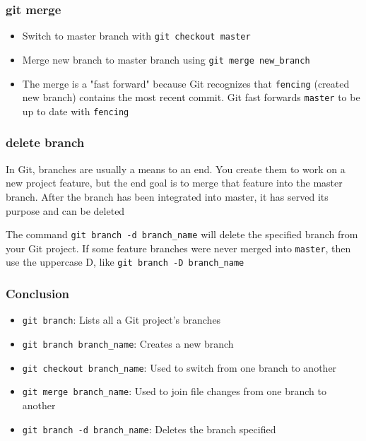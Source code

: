 \documentclass[a4paper, 12pt]{article}
\begin{document}
\subsubsection{git merge}
\begin{itemize}
\item Switch to master branch with \verb|git checkout master|

\item Merge new branch to master branch using \verb|git merge new_branch|

\item The merge is a "fast forward" because Git recognizes that \verb|fencing| (created new branch) contains the most recent commit. Git fast forwards \verb|master| to be up to date with \verb|fencing|

\end{itemize}

\subsubsection{delete branch}
In Git, branches are usually a means to an end. You create them to work on a new project feature, but the end goal is to merge that feature into the master branch. After the branch has been integrated into master, it has served its purpose and can be deleted

The command \verb|git branch -d branch_name| will delete the specified branch from your Git project. If some feature branches were never merged into \verb|master|, then use the uppercase D, like \verb|git branch -D branch_name|

\subsubsection{Conclusion}
\begin{itemize}
\item \verb|git branch|: Lists all a Git project's branches

\item \verb|git branch branch_name|: Creates a new branch

\item \verb|git checkout branch_name|: Used to switch from one branch to another

\item \verb|git merge branch_name|: Used to join file changes from one branch to another

\item \verb|git branch -d branch_name|: Deletes the branch specified

\end{itemize}
\end{document}
